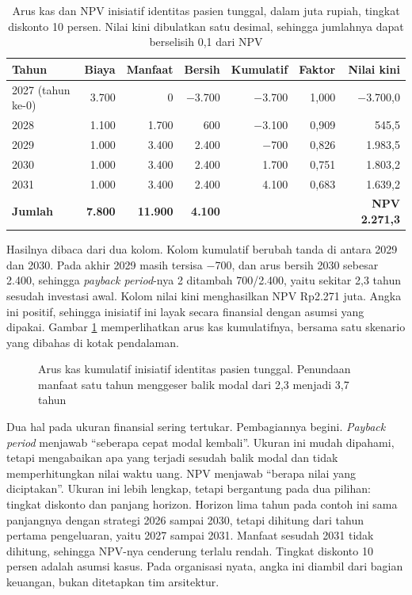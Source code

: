 \begin{table}[!htb]
  \centering
  \caption{Arus kas dan NPV inisiatif identitas pasien tunggal, dalam juta
           rupiah, tingkat diskonto 10 persen. Nilai kini dibulatkan satu
           desimal, sehingga jumlahnya dapat berselisih 0,1 dari NPV}
  \label{tab:ch13-arus-kas}
  \footnotesize
  \begin{tabularx}{\textwidth}{Xrrrrrr}
    \hline
    \textbf{Tahun} & \textbf{Biaya} & \textbf{Manfaat} & \textbf{Bersih} &
      \textbf{Kumulatif} & \textbf{Faktor} & \textbf{Nilai kini} \\
    \hline
    2027 (tahun ke-0) & 3.700 & 0 & $-$3.700 & $-$3.700 & 1,000 & $-$3.700,0 \\
    \hline
    2028 & 1.100 & 1.700 & 600 & $-$3.100 & 0,909 & 545,5 \\
    \hline
    2029 & 1.000 & 3.400 & 2.400 & $-$700 & 0,826 & 1.983,5 \\
    \hline
    2030 & 1.000 & 3.400 & 2.400 & 1.700 & 0,751 & 1.803,2 \\
    \hline
    2031 & 1.000 & 3.400 & 2.400 & 4.100 & 0,683 & 1.639,2 \\
    \hline
    \textbf{Jumlah} & \textbf{7.800} & \textbf{11.900} & \textbf{4.100} & & &
      \textbf{NPV 2.271,3} \\
    \hline
  \end{tabularx}
\end{table}

Hasilnya dibaca dari dua kolom. Kolom kumulatif berubah tanda di antara 2029
dan 2030. Pada akhir 2029 masih tersisa $-$700, dan arus bersih 2030 sebesar
2.400, sehingga \textit{payback period}-nya 2 ditambah 700/2.400, yaitu
sekitar 2,3 tahun sesudah investasi awal. Kolom nilai kini menghasilkan NPV
Rp2.271 juta. Angka ini positif, sehingga inisiatif ini layak secara
finansial dengan asumsi yang dipakai. Gambar \ref{fig:ch13-arus-kas}
memperlihatkan arus kas kumulatifnya, bersama satu skenario yang dibahas di
kotak pendalaman.

\begin{figure}[!htb]
  \centering
  
  \caption{Arus kas kumulatif inisiatif identitas pasien tunggal. Penundaan
           manfaat satu tahun menggeser balik modal dari 2,3 menjadi 3,7
           tahun}
  \label{fig:ch13-arus-kas}
\end{figure}

Dua hal pada ukuran finansial sering tertukar. Pembagiannya begini.
\textit{Payback period} menjawab ``seberapa cepat modal kembali''. Ukuran ini
mudah dipahami, tetapi mengabaikan apa yang terjadi sesudah balik modal dan
tidak memperhitungkan nilai waktu uang. NPV menjawab ``berapa nilai yang
diciptakan''. Ukuran ini lebih lengkap, tetapi bergantung pada dua
pilihan: tingkat diskonto dan panjang horizon. Horizon lima tahun pada contoh
ini sama panjangnya dengan strategi 2026 sampai 2030, tetapi dihitung dari tahun
pertama pengeluaran, yaitu 2027 sampai 2031. Manfaat sesudah 2031
tidak dihitung, sehingga NPV-nya cenderung terlalu rendah. Tingkat diskonto
10 persen adalah asumsi kasus. Pada organisasi nyata, angka ini diambil dari
bagian keuangan, bukan ditetapkan tim arsitektur.

